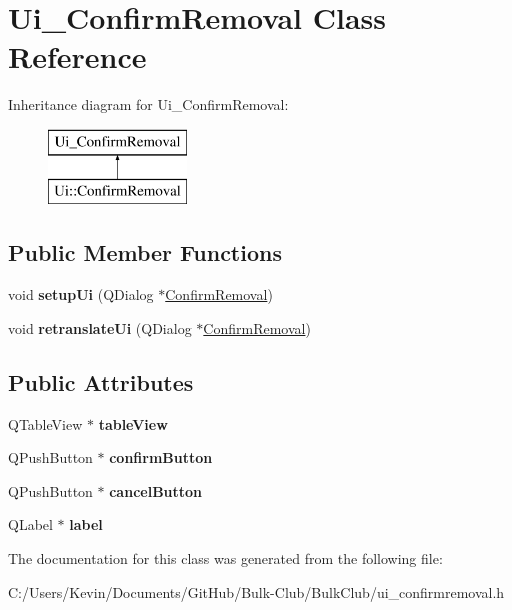 \hypertarget{class_ui___confirm_removal}{}\section{Ui\+\_\+\+Confirm\+Removal Class Reference}
\label{class_ui___confirm_removal}
Inheritance diagram for Ui\+\_\+\+Confirm\+Removal\+:\begin{figure}[H]
\begin{center}
\leavevmode
\includegraphics[height=2.000000cm]{class_ui___confirm_removal}
\end{center}
\end{figure}
\subsection*{Public Member Functions}
\begin{DoxyCompactItemize}
\item 
\mbox{\label{class_ui___confirm_removal_abce2f0c041471cb5d59d95951211c39e}} 
void {\bfseries setup\+Ui} (Q\+Dialog $\ast$\mbox{\hyperlink{class_confirm_removal}{Confirm\+Removal}})
\item 
\mbox{\label{class_ui___confirm_removal_ae74fdbda054a1bcf67f8146d6b4e6376}} 
void {\bfseries retranslate\+Ui} (Q\+Dialog $\ast$\mbox{\hyperlink{class_confirm_removal}{Confirm\+Removal}})
\end{DoxyCompactItemize}
\subsection*{Public Attributes}
\begin{DoxyCompactItemize}
\item 
\mbox{\label{class_ui___confirm_removal_a9ba6d9a3c8fa9cc5284beb8590109a30}} 
Q\+Table\+View $\ast$ {\bfseries table\+View}
\item 
\mbox{\label{class_ui___confirm_removal_ab91924afbc2dad8eab5b827d7ba15eab}} 
Q\+Push\+Button $\ast$ {\bfseries confirm\+Button}
\item 
\mbox{\label{class_ui___confirm_removal_a9ad1a10c8cb30128030e7c2eebaa5d33}} 
Q\+Push\+Button $\ast$ {\bfseries cancel\+Button}
\item 
\mbox{\label{class_ui___confirm_removal_a7c6fece30af582d8e31b8e891b94af43}} 
Q\+Label $\ast$ {\bfseries label}
\end{DoxyCompactItemize}


The documentation for this class was generated from the following file\+:\begin{DoxyCompactItemize}
\item 
C\+:/\+Users/\+Kevin/\+Documents/\+Git\+Hub/\+Bulk-\/\+Club/\+Bulk\+Club/ui\+\_\+confirmremoval.\+h\end{DoxyCompactItemize}
